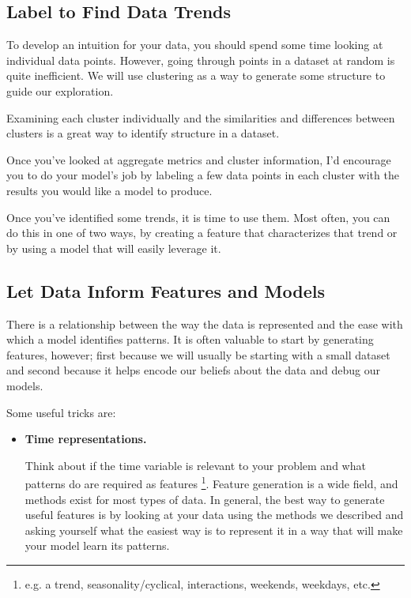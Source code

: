 \subsection{Label to Find Data Trends}
To develop an intuition for your data, you should spend some time
looking at individual data points. However, going through points
in a dataset at random is quite inefficient. We will use
clustering as a way to generate some structure to guide our
exploration.

Examining each cluster individually and the similarities
and differences between clusters is a great way to identify
structure in a dataset.

Once you've looked at aggregate metrics and cluster information,
I'd encourage you to do your model's job by labeling a few data
points in each cluster with the results you would like a model to
produce.

Once you've identified some trends, it is time to use them. Most
often, you can do this in one of two ways, by creating a feature
that characterizes that trend or by using a model that will easily
leverage it.



\subsection{Let Data Inform Features and Models}
There is a relationship between the way the data is represented
and the ease with which a model identifies patterns.
It is often valuable to start by generating features, however;
first because we will usually be starting with a small dataset and
second because it helps encode our beliefs about the data and debug
our models.

Some useful tricks are:
\begin{itemize}
    \item \textbf{Time representations.}
    
    \noindent
    Think about if the time variable is relevant to your problem
    and what patterns do are required as features
    \footnote{
        e.g. a trend, seasonality/cyclical, interactions,
        weekends, weekdays, etc.
    }.
    Feature generation is a wide field, and methods exist for most
    types of data. In general, the best way to generate useful
    features is by looking at your data using the methods we
    described and asking yourself what the easiest way is to
    represent it in a way that will make your model learn its
    patterns.
\end{itemize}









